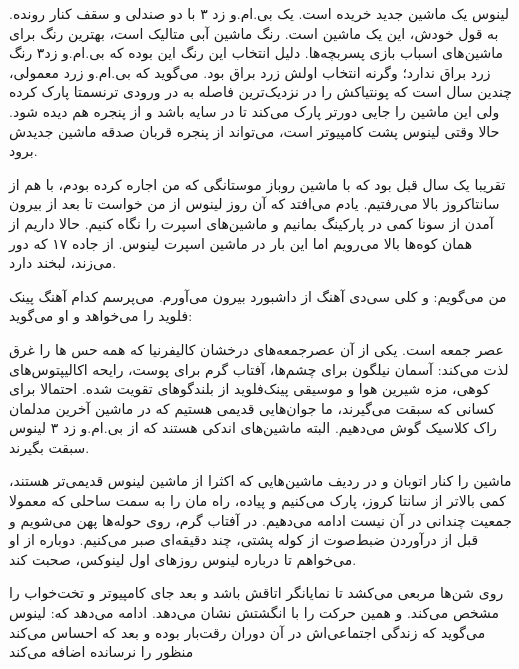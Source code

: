 \begin{journal}

لینوس یک ماشین جدید خریده است. یک بی‌.ام.و زد ۳ با دو صندلی و سقف کنار
رونده. به قول خودش، این یک ماشین  است. رنگ ماشین آبی
متالیک است، بهترین رنگ برای ماشین‌های اسباب بازی پسربچه‌ها. دلیل انتخاب
این رنگ این بوده که بی.ام.و زد۳ رنگ زرد براق ندارد؛ وگرنه انتخاب اولش
زرد براق بود. می‌گوید که بی.ام.و زرد معمولی،  چندین سال‌ است که پونتیاکش را در نزدیک‌ترین فاصله به در ورودی
ترنسمتا پارک کرده ولی این ماشین را جایی دورتر پارک می‌کند تا در سایه
باشد و از پنجره هم دیده شود. حالا وقتی لینوس پشت کامپیوتر است، می‌تواند
از پنجره قربان صدقه ماشین جدیدش برود.

تقریبا یک سال قبل بود که با ماشین روباز موستانگی که من اجاره کرده
بودم، با هم از سانتاکروز بالا می‌رفتیم. یادم می‌افتد که آن روز لینوس از
من خواست تا بعد از بیرون آمدن از سونا کمی در پارکینگ بمانیم و ماشین‌های
اسپرت را نگاه کنیم. حالا داریم از همان کوه‌ها بالا می‌رویم اما این بار
در ماشین اسپرت لینوس. از جاده ۱۷ که دور می‌زند، لبخند دارد.

من می‌گویم:  و کلی سی‌دی آهنگ از داشبورد
بیرون می‌آورم. می‌پرسم کدام آهنگ پینک فلوید را می‌خواهد و او می‌گوید:

عصر جمعه است. یکی از آن عصرجمعه‌های درخشان کالیفرنیا که همه حس ها را
غرق لذت می‌کند: آسمان نیلگون برای چشم‌ها، آفتاب گرم برای پوست، رایحه
اکالیپتوس‌های کوهی، مزه شیرین هوا و موسیقی پینک‌فلوید از بلندگوهای تقویت
شده. احتمالا برای کسانی که سبقت می‌گیرند، ما جوان‌هایی قدیمی هستیم که در
ماشین آخرین مدلمان راک کلاسیک گوش می‌دهیم. البته ماشین‌های اندکی هستند
که از بی.ام.و زد ۳ لینوس سبقت بگیرند.

ماشین را کنار اتوبان و در ردیف ماشین‌هایی که اکثرا از ماشین لینوس
قدیمی‌تر هستند، کمی بالاتر از سانتا کروز، پارک می‌کنیم و پیاده، راه مان
را به سمت ساحلی که معمولا جمعیت چندانی در آن نیست ادامه می‌دهیم. در
آفتاب گرم، روی حوله‌ها پهن می‌شویم و قبل از درآوردن ضبط‌صوت از کوله پشتی،
چند دقیقه‌ای صبر می‌کنیم. دوباره از او می‌خواهم تا درباره لینوس روزهای
اول لینوکس، صحبت کند.

روی شن‌ها مربعی می‌کشد تا نمایانگر اتاقش باشد و بعد جای کامپیوتر و
تخت‌خواب را مشخص می‌کند.  و همین حرکت را با انگشتش نشان می‌دهد. ادامه
می‌دهد که: 
لینوس می‌گوید که زندگی اجتماعی‌اش در آن دوران رقت‌بار بوده و بعد که احساس
می‌کند منظور را نرسانده اضافه می‌کند 


\end{journal}
